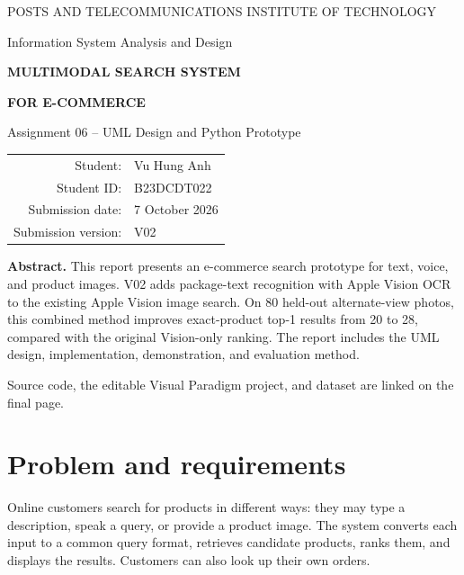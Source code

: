 \documentclass[11pt,a4paper]{article}
\begin{document}
\begin{titlepage}
\centering
\vspace*{13mm}
{\Large POSTS AND TELECOMMUNICATIONS INSTITUTE OF TECHNOLOGY\par}
\vspace{4mm}
{\large Information System Analysis and Design\par}
\vspace{23mm}
{\Huge\bfseries MULTIMODAL SEARCH SYSTEM\par}
\vspace{4mm}
{\LARGE\bfseries FOR E-COMMERCE\par}
\vspace{8mm}
{\Large Assignment 06 -- UML Design and Python Prototype\par}
\vspace{20mm}
\begin{tabular}{rl}
Student: & Vu Hung Anh \\
Student ID: & B23DCDT022 \\
Submission date: & 7 October 2026 \\
Submission version: & V02
\end{tabular}
\vspace{18mm}
\begin{minipage}{0.87\linewidth}
\textbf{Abstract.} This report presents an e-commerce search prototype for text, voice, and product images. V02 adds package-text recognition with Apple Vision OCR to the existing Apple Vision image search. On 80 held-out alternate-view photos, this combined method improves exact-product top-1 results from 20 to 28, compared with the original Vision-only ranking. The report includes the UML design, implementation, demonstration, and evaluation method.
\end{minipage}
\vfill
{\small Source code, the editable Visual Paradigm project, and dataset are linked on the final page.\par}
\end{titlepage}

\section{Problem and requirements}
Online customers search for products in different ways: they may type a description, speak a query, or provide a product image. The system converts each input to a common query format, retrieves candidate products, ranks them, and displays the results. Customers can also look up their own orders.
\end{document}
